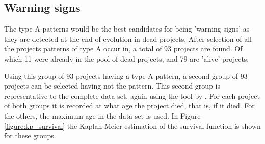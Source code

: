 \begin{comment}
\paragraph{}
For the 25 patterns of type A, which occur at the end of evolution of dead
projects (section \ref{section:patterns_dead}), the maximum LOC differences are
distributed differently than for the set of patterns as a whole. Table
\ref{table:type_a_max_diff} shows the number of type A patterns having a
certain value of maximum LOC difference.



\noindent
Table \ref{table:type_a_max_diff} suggests that Hypothesis
\ref{hyp:pattern_low_diff} is \emph{false}\rm: it is not typically the case
that patterns in LOC at the end of code evolution of dead projects have a low
difference in LOC. The hypothesis is false in this data set.

\paragraph{}
The four patterns having the most common values of maximum LOC difference are
shown in Figure \ref{figure:top_patterns_plots} to illustrate how these look
like. The figure depicts the wavelets of the patterns, which are the LOC values
at a given snapshot in time for the dead project it was detected in.



\paragraph{}
Figure \ref{figure:top_patterns_plots} also show the lengths of the patterns.
The shortest pattern lasts 19 months, the longest 57. 75\% of the type A
patterns detected have a length of at least 25 months.
\end{comment}

\subsection{Warning signs}
The type A patterns would be the best candidates for being 'warning signs' as
they are detected at the end of evolution in dead projects. After selection of
all the projects patterns of type A occur in, a total of 93 projects are found.
Of which 11 were already in the pool of dead projects, and 79 are 'alive'
projects.

Using this group of 93 projects having a type A pattern, a second group of 93
projects can be selected having not the pattern. This second group is
representative to the complete data set, again using the tool by
\citet{nagappan}. For each project of both groups it is recorded at what age the
project died, that is, if it died. For the others, the maximum age in the data
set is used. In Figure \ref{figure:kp_survival} the Kaplan-Meier estimation of
the survival function is shown for these groups.

